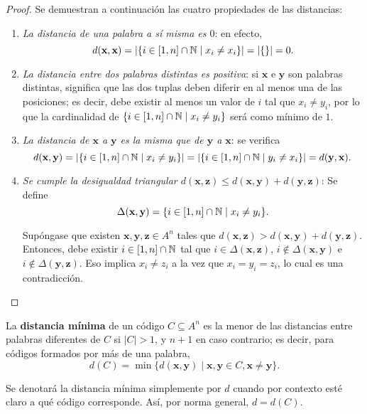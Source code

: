 \begin{proof}
	Se demuestran a continuación las cuatro propiedades de las distancias:
	\begin{enumerate}
		\item \textit{La distancia de una palabra a sí misma es $0$}: en efecto,
		\[d(\textbf{x}, \textbf{x}) = |\{i\in[1,n]\cap\mathbb{N} \mid x_i \neq x_i\}| = |\{\}| = 0.\]
		\item \textit{La distancia entre dos palabras distintas es positiva}: si $\textbf{x}$ e $\textbf{y}$ son palabras distintas, significa que las dos tuplas deben diferir en al menos una de las posiciones; es decir, debe existir al menos un valor de $i$ tal que $x_i \neq y_i$, por lo que la cardinalidad de $\{i \in [1, n]\cap\mathbb{N} \mid x_i \neq y_i\}$ será como mínimo de $1$.
		\item \textit{La distancia de $\textbf{x}$ a $\textbf{y}$ es la misma que de $\textbf{y}$ a $\textbf{x}$}: se verifica
		\[d(\textbf{x}, \textbf{y}) = |\{i\in[1,n]\cap\mathbb{N} \mid x_i \neq y_i\}| = |\{i\in[1,n]\cap\mathbb{N} \mid y_i \neq x_i\}| = d(\textbf{y}, \textbf{x}).\]
		\item \textit{Se cumple la desigualdad triangular $d(\textbf{x}, \textbf{z}) \leq d(\textbf{x}, \textbf{y}) + d(\textbf{y}, \textbf{z})$}:
		Se define
		\[\Delta(\textbf{x}, \textbf{y}) = \{i\in[1,n]\cap\mathbb{N} \mid x_i \neq y_i\}.\]
		
		Supóngase que existen $\textbf{x}, \textbf{y}, \textbf{z} \in A^n$ tales que $d(\textbf{x}, \textbf{z}) > d(\textbf{x}, \textbf{y}) + d(\textbf{y}, \textbf{z})$. Entonces, debe existir $i \in [1, n]\cap\mathbb{N}$ tal que $i \in \Delta(\textbf{x}, \textbf{z})$, $i \notin \Delta(\textbf{x}, \textbf{y})$ e $i \notin \Delta(\textbf{y}, \textbf{z})$. Eso implica $x_i \neq z_i$ a la vez que $x_i = y_i = z_i$, lo cual es una contradicción.
	\end{enumerate}
\end{proof}

\begin{definition}
	La \textbf{distancia mínima} de un código $C \subseteq A^n$ es la menor de las distancias entre palabras diferentes de $C$ si $|C| > 1$, y $n+1$ en caso contrario; es decir, para códigos formados por más de una palabra,
	\[d(C) = \min\{d(\textbf{x}, \textbf{y}) \mid \textbf{x}, \textbf{y} \in C, \textbf{x}\neq\textbf{y}\}.\]
	
	\begin{remark}
		Se denotará la distancia mínima simplemente por $d$ cuando por contexto esté claro a qué código corresponde. Así, por norma general, $d = d(C)$.
	\end{remark}
\end{definition}

